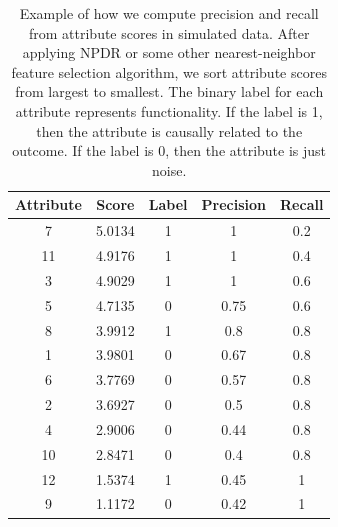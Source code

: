 \documentclass[10pt,letterpaper]{article}
\begin{document}
\begin{table}[!h]
	\centering
	\caption[Example of precision and recall for attribute scores]{Example of how we compute precision and recall from attribute scores in simulated data. After applying NPDR or some other nearest-neighbor feature selection algorithm, we sort attribute scores from largest to smallest. The binary label for each attribute represents functionality. If the label is 1, then the attribute is causally related to the outcome. If the label is 0, then the attribute is just noise.}\label{tab:auPRC}
	\begin{tabular}{ccccc}\hline
		\textbf{Attribute} & \textbf{Score} & \textbf{Label} & \textbf{Precision} & \textbf{Recall} \\ \hline
		7 & 5.0134 & 1 & 1 & 0.2 \\
		11 & 4.9176 & 1 & 1 & 0.4 \\
		3 & 4.9029 & 1 & 1 & 0.6 \\
		5 & 4.7135 & 0 & 0.75 & 0.6 \\
		8 & 3.9912 & 1 & 0.8 & 0.8 \\
		1 & 3.9801 & 0 & 0.67 & 0.8 \\
		6 & 3.7769 & 0 & 0.57 & 0.8 \\
		2 & 3.6927 & 0 & 0.5 & 0.8 \\
		4 & 2.9006 & 0 & 0.44 & 0.8 \\
		10 & 2.8471 & 0 & 0.4 & 0.8 \\
		12 & 1.5374 & 1 & 0.45 & 1 \\
		9 & 1.1172 & 0 & 0.42 & 1 \\ \hline
	\end{tabular}
\end{table}
\end{document}

